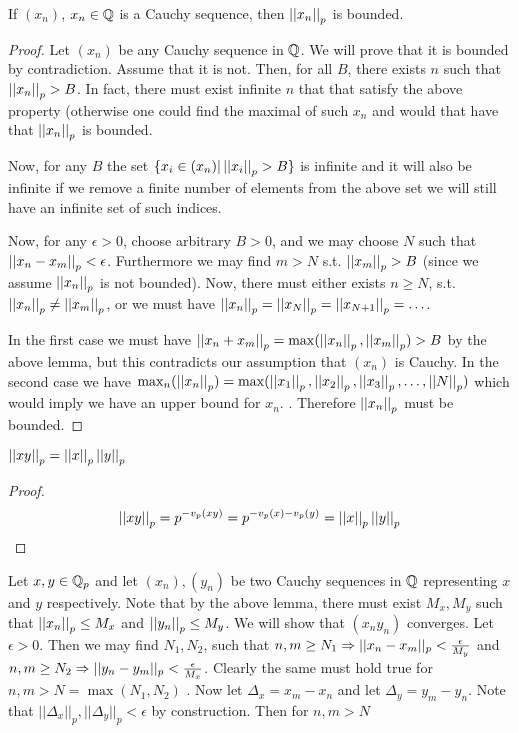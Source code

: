 \begin{lemma}
If $(x_n)$, $x_n\in \mathbb{Q}$ is a Cauchy sequence, then $\left|\left| x_n \right|\right|_p$ is bounded. 
\begin{proof}
Let $(x_n)$ be any Cauchy sequence in $\mathbb{Q}$. We will prove that it is bounded by contradiction. Assume that it is not. Then, for all $B$, there exists $n$ such that $\left|\left| x_n \right|\right|_p>B$. In fact, there must exist infinite $n$ that that satisfy the above property (otherwise one could find the maximal of such $x_n$ and would that have that $\left|\left| x_n \right|\right|_p$ is bounded.

Now, for any $B$ the set $\{ x_i \in (x_n) | \left|\left| x_i \right|\right|_p > B \}$ is infinite and it will also be infinite if we remove a finite number of elements from the above set we will still have an infinite set of such indices. 

Now, for any $\epsilon>0$, choose arbitrary $B>0$, and we may choose $N$ such that $\left|\left| x_n-x_m \right|\right|_p<\epsilon$. Furthermore we may find $m>N$ s.t. $\left|\left| x_m \right|\right|_p>B$ (since we assume $\left|\left| x_n \right|\right|_p$ is not bounded). Now, there must either exists $n\geq N$, s.t. $\left|\left| x_n \right|\right|_p\neq\left|\left| x_m \right|\right|_p$, or we must have $\left|\left| x_n \right|\right|_p=\left|\left| x_N \right|\right|_p=\left|\left| x_{N+1} \right|\right|_p=\ldots$. \par 
In the first case we must have $\left|\left| x_n+x_m \right|\right|_p = \max(\left|\left| x_n \right|\right|_p,\left|\left| x_m \right|\right|_p)>B$ by the above lemma, but this contradicts our assumption that $(x_n)$ is Cauchy. In the second case we have $\max_n(\left|\left| x_n \right|\right|_p)=\max(\left|\left| x_1 \right|\right|_p,\left|\left| x_2 \right|\right|_p,\left|\left| x_3 \right|\right|_p, \ldots, \left|\left| N \right|\right|_p)$ which would imply we have an upper bound for $x_n$. . Therefore $\left|\left| x_n \right|\right|_p$ must be bounded. 
\end{proof}
\end{lemma}
\begin{lemma} $\left|\left| xy \right|\right|_p = \left|\left| x \right|\right|_p\left|\left| y \right|\right|_p$
\begin{proof}
\[ \left|\left| xy \right|\right|_p = p^{-v_p(xy)} = p^{-v_p(x)-v_p(y)} = \left|\left| x \right|\right|_p\left|\left| y \right|\right|_p \]
\end{proof}
\end{lemma}
 Let $x,y\in \mathbb{Q}_p$ and let $(x_n), (y_n)$ be two Cauchy sequences in $\mathbb{Q}$ representing $x$ and $y$ respectively. Note that by the above lemma, there must exist $M_x, M_y$ such that $\left|\left| x_n \right|\right|_p\leq M_x$ and $\left|\left| y_n \right|\right|_p\leq M_y$. We will show that $(x_ny_n)$ converges. Let $\epsilon>0$. Then we may find $N_1, N_2$, such that $n,m \geq N_1 \Rightarrow ||x_n - x_m||_p < \frac{\epsilon}{M_y}$ and $n,m \geq N_2 \Rightarrow ||y_n - y_m||_p < \frac{\epsilon}{M_x}$. Clearly the same must hold true for $n,m>N=\max(N_1,N_2)$ . Now let $\Delta_x = x_m-x_n$ and let $\Delta_y = y_m-y_n$. Note that $||\Delta_x||_p, ||\Delta_y||_p < \epsilon $ by construction. Then for $n,m>N$ 
